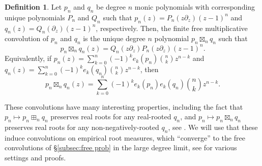 \documentclass[reqno]{amsart}
\newcommand{\1}{\mathbf{1}}
\theoremstyle{plain}
\theoremstyle{definition}
\newtheorem{definition}[theorem]{Definition}
\theoremstyle{remark}
\numberwithin{equation}{section}
\begin{document}
\begin{definition}\label{def:finite boxtimes}
		Let $p_n$ and $q_n$ be degree $n$ monic polynomials with corresponding unique polynomials  $P_n$ and $Q_{n}$ such that $p_n(z)=P_n(z\partial_{z})(z-1)^{n}$ and $q_{n}(z)=Q_n(\partial_{z})(z-1)^n$, respectively.
	Then, the finite free multiplicative convolution  of $p_n$ and $q_n$ is the unique degree $n$ polynomial $p_n\boxtimes_{n}q_n$ such that \begin{equation*}
		p_n\boxtimes_{n}q_{n}(z)=Q_n(z\partial_{z})P_n(z\partial_{z})(z-1)^n.
	\end{equation*} Equivalently, if $p_n(z)=\sum_{k=0}^{n}(-1)^{k}e_{k}(p_n)\binom{n}{k}z^{n-k}$ and $q_n(z)=\sum_{k=0}^{n}(-1)^{k}e_{k}(q_n)\binom{n}{k}z^{n-k}$, then \begin{equation*}
	p_n\boxtimes_{n}q_n(z)=\sum_{k=0}^{n}(-1)^{k}e_{k}(p_n)e_{k}(q_n)\binom{n}{k}z^{n-k}. 
	\end{equation*}
\end{definition} 

These convolutions have many interesting properties, including the fact that $p_n\mapsto p_n\boxplus_n q_n$ preserves real roots for any real-rooted $q_n$, and $p_n\mapsto p_n\boxtimes_n q_n$ preserves real roots for any non-negatively-rooted $q_n$, see \cite{Marcus-Spielman-Srivastava2022}. We will use that these induce convolutions on empirical root measures, which ``converge'' to the free convolutions of \S \ref{subsec:free prob} in the large degree limit, see \cite{Marcus2021,Arizmendi-Perales2018,Arizmendi-GarzaVargas-Perales2023,Arizmendi-Fujie-Perales-Ueda2024,Jalowy-Kabluchko-Marynych2025,Fujie2026} for various settings and proofs.
\end{document}

